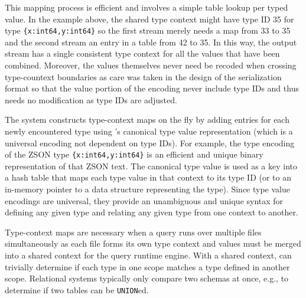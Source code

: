 This mapping process is efficient and involves a simple table lookup per typed value.  In the example above, the shared type context might have type ID 35 for type \texttt{\{x:int64,y:int64\}} so the first stream merely needs a map from 33 to 35 and the second stream an entry in a table from 42 to 35.  In this way, the output stream has a single consistent type context for all the values that have been combined.  Moreover, the values themselves never need be recoded when crossing type-countext boundaries as care was taken in the design of the serialization format so that the value portion of the encoding never include type IDs and thus needs no modification as type IDs are adjusted.

The \sys{} system constructs type-context maps on the fly by adding entries for each newly encountered type using \zed{}'s canonical type value representation (which is a universal encoding not dependent on type IDs).  For example, the type encoding of the ZSON type \texttt{\{x:int64,y:int64\}} is an efficient and unique binary representation of that ZSON text. The canonical type value is used as a key into a hash table that maps each type value in that context to its type ID (or to an in-memory pointer to a data structure representing the type).  Since type value encodings are universal, they provide an unambiguous and unique syntax for defining any given type and relating any given type from one context to another.

Type-context maps are necessary when a query runs over multiple files simultaneously as each file forms its own type context and values must be merged into a shared context for the query runtime engine. With a shared context, \sys{} can trivially determine if each type in one scope matches a type defined in another scope. Relational systems typically only compare two schemas at once, e.g., to determine if two tables can be \texttt{UNION}ed.

